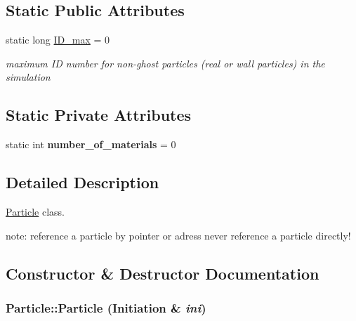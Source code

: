 \subsection*{Static Public Attributes}
\begin{CompactItemize}
\item 
\hypertarget{classParticle_c8d46625d0bcafc38564f213b9668580}{
static long \hyperlink{classParticle_c8d46625d0bcafc38564f213b9668580}{ID\_\-max} = 0}
\label{classParticle_c8d46625d0bcafc38564f213b9668580}

\begin{CompactList}\small\item\em maximum ID number for non-ghost particles (real or wall particles) in the simulation \item\end{CompactList}\end{CompactItemize}
\subsection*{Static Private Attributes}
\begin{CompactItemize}
\item 
\hypertarget{classParticle_cbf60684ef8e09fb20fcd2e9aacf723f}{
static int \textbf{number\_\-of\_\-materials} = 0}
\label{classParticle_cbf60684ef8e09fb20fcd2e9aacf723f}

\end{CompactItemize}


\subsection{Detailed Description}
\hyperlink{classParticle}{Particle} class. 

note: reference a particle by pointer or adress never reference a particle directly! 

\subsection{Constructor \& Destructor Documentation}
\hypertarget{classParticle_91ea71cca6b4c538391fc881bc8da59a}{
\subsubsection[{Particle}]{\setlength{\rightskip}{0pt plus 5cm}Particle::Particle ({\bf Initiation} \& {\em ini})}}
\label{classParticle_91ea71cca6b4c538391fc881bc8da59a}


